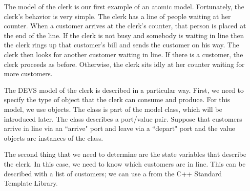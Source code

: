 The model of the clerk is our first example of an atomic model. Fortunately, the clerk's behavior is very simple.
The clerk has a line of people waiting at her counter. When a
customer arrives at the clerk's counter, that person is placed at the
end of the line. If the clerk is not busy and somebody is waiting
in line then the clerk rings up that customer's bill and sends
the customer on his way. The clerk then looks for another customer
waiting in line. If there is a customer, the clerk proceeds as
before. Otherwise, the clerk sits idly at her counter waiting for
more customers.

The DEVS model of the clerk is described in a particular way.
First, we need to specify the type of object that the clerk can consume and
produce. For this model, we use  objects. The 
class is part of the  model class, which will be introduced later. The  class describes a port/value pair.
Suppose that customers arrive in
line via an ``arrive" port and leave via a ``depart"
port and the value objects are instances of the  class. 

The second thing that we need to determine are the state
variables that describe the clerk. In this case, 
we need to know which customers are in line. This can be
described with a list of customers; we can use a  from the C++
Standard Template Library.

